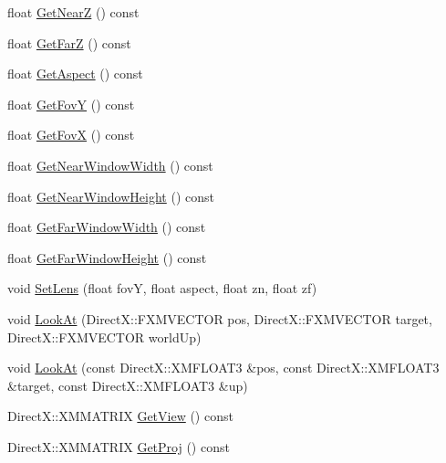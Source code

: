 \begin{DoxyCompactItemize}
float \hyperlink{class_camera_a92013a85a28e6630cfd10e91d950e591_a92013a85a28e6630cfd10e91d950e591}{Get\+NearZ} () const 
\item 
float \hyperlink{class_camera_a11092eb87e4cb3951eab58ab0f3623af_a11092eb87e4cb3951eab58ab0f3623af}{Get\+FarZ} () const 
\item 
float \hyperlink{class_camera_a7eebaafe37771da0bb226a29ee3ccde2_a7eebaafe37771da0bb226a29ee3ccde2}{Get\+Aspect} () const 
\item 
float \hyperlink{class_camera_a8f0417287a9a19bb894cd407e9f50433_a8f0417287a9a19bb894cd407e9f50433}{Get\+FovY} () const 
\item 
float \hyperlink{class_camera_a775672eae00047c1f036bc7977c6e6ad_a775672eae00047c1f036bc7977c6e6ad}{Get\+FovX} () const 
\item 
float \hyperlink{class_camera_ad3de17ae1dcb65ffa525548dddfc2371_ad3de17ae1dcb65ffa525548dddfc2371}{Get\+Near\+Window\+Width} () const 
\item 
float \hyperlink{class_camera_a92ab1f57e1a9f905172482e16e0d2d75_a92ab1f57e1a9f905172482e16e0d2d75}{Get\+Near\+Window\+Height} () const 
\item 
float \hyperlink{class_camera_aa52d53e0134dbdf4bc88958e09425eb2_aa52d53e0134dbdf4bc88958e09425eb2}{Get\+Far\+Window\+Width} () const 
\item 
float \hyperlink{class_camera_ab083bd927f87306f0ab0b9cb6545f535_ab083bd927f87306f0ab0b9cb6545f535}{Get\+Far\+Window\+Height} () const 
\item 
void \hyperlink{class_camera_a5619188052108689a7a3171597fca7b6_a5619188052108689a7a3171597fca7b6}{Set\+Lens} (float fovY, float aspect, float zn, float zf)
\item 
void \hyperlink{class_camera_a34d7f37c11a8e47788cd360940076874_a34d7f37c11a8e47788cd360940076874}{Look\+At} (Direct\+X\+::\+F\+X\+M\+V\+E\+C\+T\+OR pos, Direct\+X\+::\+F\+X\+M\+V\+E\+C\+T\+OR target, Direct\+X\+::\+F\+X\+M\+V\+E\+C\+T\+OR world\+Up)
\item 
void \hyperlink{class_camera_a247885e75b1f7ca8f4ab3eff72c874a6_a247885e75b1f7ca8f4ab3eff72c874a6}{Look\+At} (const Direct\+X\+::\+X\+M\+F\+L\+O\+A\+T3 \&pos, const Direct\+X\+::\+X\+M\+F\+L\+O\+A\+T3 \&target, const Direct\+X\+::\+X\+M\+F\+L\+O\+A\+T3 \&up)
\item 
Direct\+X\+::\+X\+M\+M\+A\+T\+R\+IX \hyperlink{class_camera_a5a1a8ddceb04c093f440d4c9dcadbc77_a5a1a8ddceb04c093f440d4c9dcadbc77}{Get\+View} () const 
\item 
Direct\+X\+::\+X\+M\+M\+A\+T\+R\+IX \hyperlink{class_camera_ab49825897594ec2da5a4875ccb1620f2_ab49825897594ec2da5a4875ccb1620f2}{Get\+Proj} () const 

\end{DoxyCompactItemize}
